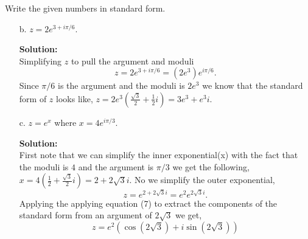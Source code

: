 \documentclass[12pt]{article}
\makeatletter
\theoremstyle{homework}
\newenvironment{exercise}[1]
{\def\@currentlabel{#1}\exercisecore}
{\endexercisecore}
\newcommand{\localhead}[1]{\par\smallskip\noindent\textbf{#1}\nobreak\\}%
\newcommand\solution{\localhead{Solution:}}
\makeatother
\begin{document}
\begin{exercise}{2} Write the given numbers in standard form.\\
    \begin{enumerate}
        \item[b.] $z = 2e^{3 + i\pi/6}$.
        \solution Simplifying $z$ to pull the argument and moduli
        \begin{equation*}
            z = 2e^{3 + i\pi/6} = (2e^3)e^{i\pi/6}.
        \end{equation*}
        Since $\pi/6$ is the argument and the moduli is $2e^3$ we know that the standard form of $z$ looks like, 
        $z = 2e^3(\frac{\sqrt{3}}{2} + \frac{1}{2}i) = 3e^3+ e^3i$.



        \item[c.] $z = e^x$ where $x = 4e^{i\pi/3}$.
        \solution First note that we can simplify the inner exponential(x) with the fact that the moduli is $4$ and the argument is 
        $\pi/3$ we get the following, $x = 4(\frac{1}{2} + \frac{\sqrt{3}}{2}i) = 2 + 2\sqrt{3}i$. No we simplify the outer exponential,
        \begin{equation*}
            z = e^{2 + 2\sqrt{3}i} =e^2e^{2\sqrt{3}i}.
        \end{equation*}
        Applying the applying equation (7) to extract the components of the standard form from an argument of $2\sqrt{3}$ we get, 
        \begin{equation*}
            z = e^2(\cos(2\sqrt{3}) + i \sin(2\sqrt{3}))
        \end{equation*}
    \end{enumerate}
    
\end{exercise}
\vspace{.5in}
\end{document}
